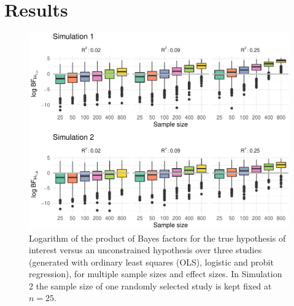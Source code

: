 \documentclass[]{interact}
\theoremstyle{plain}%
\theoremstyle{definition}
\theoremstyle{remark}
\begin{document}
\begin{table}[ht]
\centering
\caption{Population-level regression coefficients for ordinary least squares (OLS), logistic and probit regression, given effect sizes of $R^2 \in \{0.02, 0.09, 0.25\}$.} 
\label{tab:coefs}
\end{table}
\vspace{-8mm}

\hypertarget{results}{%
\section{Results}\label{results}}

\begin{figure}
\includegraphics[width=1\linewidth]{research_report_volker_files/figure-latex/fig1-1} \caption{\label{fig1}Logarithm of the product of Bayes factors for the true hypothesis of interest versus an unconstrained hypothesis over three studies (generated with ordinary least squares (OLS), logistic and probit regression), for multiple sample sizes and effect sizes. In Simulation 2 the sample size of one randomly selected study is kept fixed at $n = 25$.}\label{fig:fig1}
\end{figure}
\end{document}
